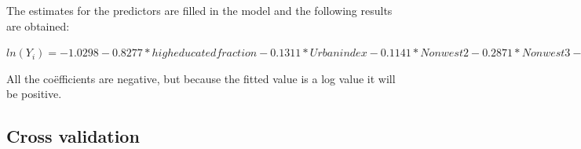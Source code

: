 \documentclass[11pt,]{article}
\begin{document}
The estimates for the predictors are filled in the model and the
following results are obtained:

\(ln(Y_i) = -1.0298 -0.8277*high educated fraction -0.1311*Urban index -0.1141*Non west2 -0.2871*Non west3 -3.0168*Frac 60plus + \epsilon i\)

All the coëfficients are negative, but because the fitted value is a log
value it will be positive.

\subsection{Cross validation}\label{cross-validation}
\end{document}
